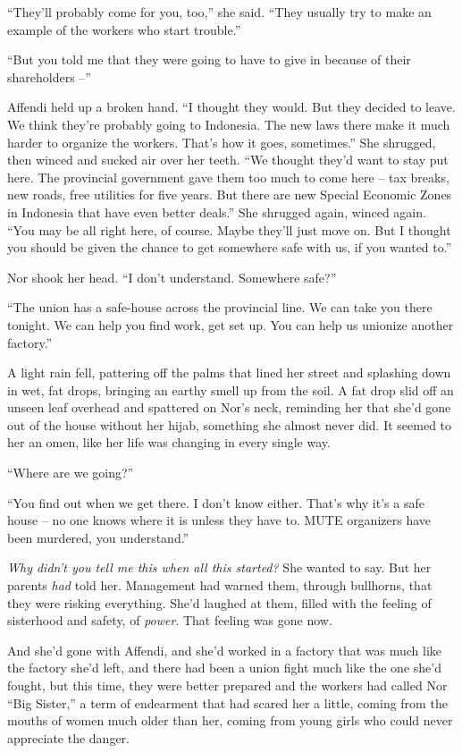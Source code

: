 ``They'll probably come for you, too,'' she said. ``They usually try
to make an example of the workers who start trouble.''

``But you told me that they were going to have to give in because of
their shareholders --''

Affendi held up a broken hand. ``I thought they would. But they
decided to leave. We think they're probably going to Indonesia. The
new laws there make it much harder to organize the workers. That's
how it goes, sometimes.'' She shrugged, then winced and sucked air
over her teeth. ``We thought they'd want to stay put here. The
provincial government gave them too much to come here -- tax
breaks, new roads, free utilities for five years. But there are new
Special Economic Zones in Indonesia that have even better deals.''
She shrugged again, winced again. ``You may be all right here, of
course. Maybe they'll just move on. But I thought you should be
given the chance to get somewhere safe with us, if you wanted to.''

Nor shook her head. ``I don't understand. Somewhere safe?''

``The union has a safe-house across the provincial line. We can take
you there tonight. We can help you find work, get set up. You can
help us unionize another factory.''

A light rain fell, pattering off the palms that lined her street
and splashing down in wet, fat drops, bringing an earthy smell up
from the soil. A fat drop slid off an unseen leaf overhead and
spattered on Nor's neck, reminding her that she'd gone out of the
house without her hijab, something she almost never did. It seemed
to her an omen, like her life was changing in every single way.

``Where are we going?''

``You find out when we get there. I don't know either. That's why
it's a safe house -- no one knows where it is unless they have to.
MUTE organizers have been murdered, you understand.''

\emph{Why didn't you tell me this when all this started?} She
wanted to say. But her parents \emph{had} told her. Management had
warned them, through bullhorns, that they were risking everything.
She'd laughed at them, filled with the feeling of sisterhood and
safety, of \emph{power}. That feeling was gone now.

And she'd gone with Affendi, and she'd worked in a factory that was
much like the factory she'd left, and there had been a union fight
much like the one she'd fought, but this time, they were better
prepared and the workers had called Nor ``Big Sister,'' a term of
endearment that had scared her a little, coming from the mouths of
women much older than her, coming from young girls who could never
appreciate the danger.

